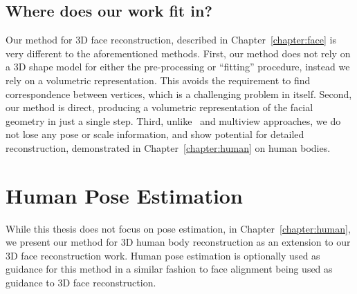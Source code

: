 \subsection{Where does our work fit in?}

Our method for 3D face reconstruction, described in
Chapter~\ref{chapter:face} is very different to the aforementioned
methods. First, our method does not rely on a 3D shape model for
either the pre-processing or ``fitting'' procedure, instead we rely on
a volumetric representation. This avoids the requirement to find
correspondence between vertices, which is a challenging problem in
itself. Second, our method is direct, producing a volumetric
representation of the facial geometry in just a single step. Third,
unlike~\cite{tran2018extreme} and multiview approaches, we do not lose
any pose or scale information, and show potential for detailed
reconstruction, demonstrated in Chapter~\ref{chapter:human} on human
bodies.

\section{Human Pose Estimation}

While this thesis does not focus on pose estimation, in
Chapter~\ref{chapter:human}, we present our method for 3D human body
reconstruction as an extension to our 3D face reconstruction
work. Human pose estimation is optionally used as guidance for this
method in a similar fashion to face alignment being used as guidance
to 3D face reconstruction.

